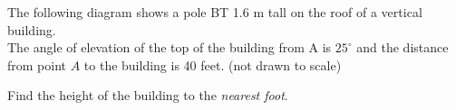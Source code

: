 \item The following diagram shows a pole BT 1.6 m tall on the roof of a vertical building. \\[0.25cm]
The angle of elevation of the top of the building from A is  
$25^\circ$ and the distance from point $A$ to the building is 40 feet. (not drawn to scale)
  \begin{center}
    \end{center}
    Find the height of the building to the \emph{nearest foot}.